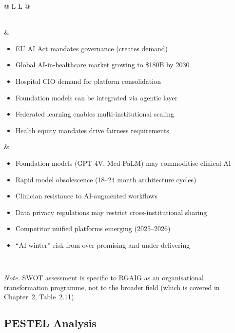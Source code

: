 {\begin{xltabular}{\textwidth}{@{} L L @{}}
\begin{minipage}[t]{\linewidth}
\end{minipage} \\
\midrule
{} &  \\
\midrule
\begin{minipage}[t]{\linewidth}
\begin{itemize}[leftmargin=*,nosep]
\item EU AI Act mandates governance (creates demand)
\item Global AI-in-healthcare market growing to \$180B by 2030
\item Hospital CIO demand for platform consolidation
\item Foundation models can be integrated via agentic layer
\item Federated learning enables multi-institutional scaling
\item Health equity mandates drive fairness requirements
\end{itemize}
\end{minipage}
&
\begin{minipage}[t]{\linewidth}
\begin{itemize}[leftmargin=*,nosep]
\item Foundation models (GPT-4V, Med-PaLM) may commoditise clinical AI
\item Rapid model obsolescence (18--24 month architecture cycles)
\item Clinician resistance to AI-augmented workflows
\item Data privacy regulations may restrict cross-institutional sharing
\item Competitor unified platforms emerging (2025--2026)
\item ``AI winter'' risk from over-promising and under-delivering
\end{itemize}
\end{minipage} \\
\end{xltabular}}
\vspace{0.5em}\noindent\textit{Note.} SWOT assessment is specific to RGAIG as an organisational transformation programme, not to the broader field (which is covered in Chapter~2, Table~2.11).

\subsection{PESTEL Analysis}
\label{sec:dt_pestel}

